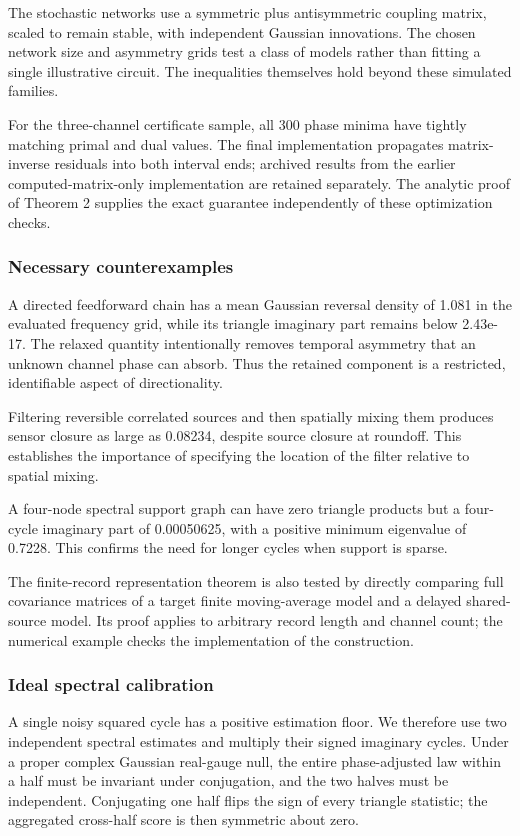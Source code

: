 \documentclass[11pt,a4paper]{article}
\begin{document}
The stochastic networks use a symmetric plus antisymmetric coupling matrix, scaled to remain stable, with independent Gaussian innovations. The chosen network size and asymmetry grids test a class of models rather than fitting a single illustrative circuit. The inequalities themselves hold beyond these simulated families.

For the three-channel certificate sample, all 300 phase minima have tightly matching primal and dual values. The final implementation propagates matrix-inverse residuals into both interval ends; archived results from the earlier computed-matrix-only implementation are retained separately. The analytic proof of Theorem 2 supplies the exact guarantee independently of these optimization checks.

\subsubsection{Necessary counterexamples}

A directed feedforward chain has a mean Gaussian reversal density of 1.081 in the evaluated frequency grid, while its triangle imaginary part remains below 2.43e-17. The relaxed quantity intentionally removes temporal asymmetry that an unknown channel phase can absorb. Thus the retained component is a restricted, identifiable aspect of directionality.

Filtering reversible correlated sources and then spatially mixing them produces sensor closure as large as 0.08234, despite source closure at roundoff. This establishes the importance of specifying the location of the filter relative to spatial mixing.

A four-node spectral support graph can have zero triangle products but a four-cycle imaginary part of 0.00050625, with a positive minimum eigenvalue of 0.7228. This confirms the need for longer cycles when support is sparse.

The finite-record representation theorem is also tested by directly comparing full covariance matrices of a target finite moving-average model and a delayed shared-source model. Its proof applies to arbitrary record length and channel count; the numerical example checks the implementation of the construction.

\subsubsection{Ideal spectral calibration}

A single noisy squared cycle has a positive estimation floor. We therefore use two independent spectral estimates and multiply their signed imaginary cycles. Under a proper complex Gaussian real-gauge null, the entire phase-adjusted law within a half must be invariant under conjugation, and the two halves must be independent. Conjugating one half flips the sign of every triangle statistic; the aggregated cross-half score is then symmetric about zero.
\end{document}
